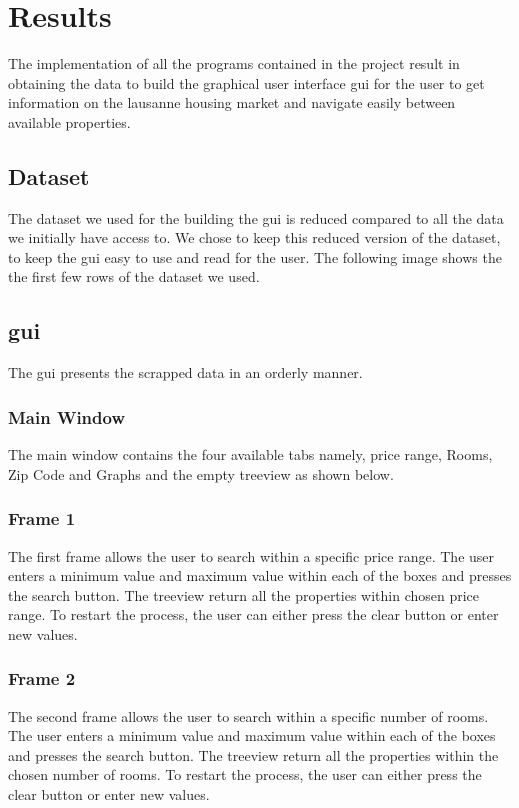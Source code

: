 \documentclass[main]{subfiles}
\begin{document}
\section{Results}
The implementation of all the programs contained in the project result in obtaining the data to build the graphical user interface \ac{gui} 
for the user to get information on the lausanne housing market and navigate easily between available properties.

\subsection{Dataset}
The dataset we used for the building the \ac{gui} is reduced compared to all the data we initially have access to. 
We chose to keep this reduced version of the dataset, to keep the \ac{gui} easy to use and read for the user. 
The following image shows the the first few rows of the dataset we used.


\subsection{\ac{gui}}
The \ac{gui} presents the scrapped data in an orderly manner.
\subsubsection{Main Window}
The main window contains the four available tabs namely, price range, Rooms, Zip Code and Graphs and the empty treeview as shown below.

\subsubsection{Frame 1}
The first frame allows the user to search within a specific price range. 
The user enters a minimum value and maximum value within each of the boxes and presses the search button. 
The treeview return all the properties within chosen price range. 
To restart the process, the user can either press the clear button or enter new values.

\subsubsection{Frame 2}
The second frame allows the user to search within a specific number of rooms. 
The user enters a minimum value and maximum value within each of the boxes and presses the search button. 
The treeview return all the properties within the chosen number of rooms. 
To restart the process, the user can either press the clear button or enter new values.
\end{document}
